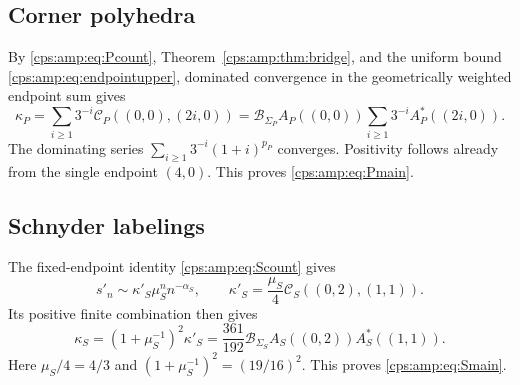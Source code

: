 \documentclass[11pt,letterpaper]{article}
\numberwithin{equation}{section}
\theoremstyle{remark}\newtheorem{remark}[theorem]{Remark}
\begin{document}
\subsection{Corner polyhedra}
By \eqref{cps:amp:eq:Pcount}, Theorem~\ref{cps:amp:thm:bridge}, and the uniform bound \eqref{cps:amp:eq:endpointupper}, dominated convergence in the geometrically weighted endpoint sum gives
\begin{equation}\label{cps:amp:eq:kappaP}
 \kappa_P=\sum_{i\ge1}3^{-i}\mathcal C_P((0,0),(2i,0))
 =\mathcal B_{\Sigma_P}A_P((0,0))
   \sum_{i\ge1}3^{-i}A_P^*((2i,0)).
\end{equation}
The dominating series $\sum_{i\ge1}3^{-i}(1+i)^{p_P}$ converges. Positivity follows already from the single endpoint $(4,0)$. This proves \eqref{cps:amp:eq:Pmain}.

\subsection{Schnyder labelings}
The fixed-endpoint identity \eqref{cps:amp:eq:Scount} gives
\begin{equation}\label{cps:amp:eq:kappaSprime}
 s'_n\sim\kappa'_S\mu_S^nn^{-\alpha_S},\qquad
 \kappa'_S=\frac{\mu_S}{4}\mathcal C_S((0,2),(1,1)).
\end{equation}
Its positive finite combination then gives
\begin{equation}\label{cps:amp:eq:kappaS}
 \kappa_S=(1+\mu_S^{-1})^2\kappa'_S
 =\frac{361}{192}\mathcal B_{\Sigma_S}A_S((0,2))A_S^*((1,1)).
\end{equation}
Here $\mu_S/4=4/3$ and $(1+\mu_S^{-1})^2=(19/16)^2$. This proves \eqref{cps:amp:eq:Smain}.
\end{document}
